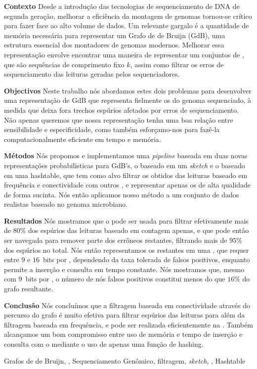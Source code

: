 \resumo

\textbf{Contexto} Desde a introdução das tecnologias de sequenciamento de DNA de segunda geração, melhorar a eficiência da montagem de genomas tornou-se crítico para fazer face ao alto volume de dados. Um relevante gargalo é a quantidade de memória necessária para representar um Grafo de de Bruijn (GdB), uma estrutura essencial dos montadores de genomas modernos. Melhorar essa representação envolve encontrar uma maneira de representar um conjuntos de \kmers, que são sequências de comprimento fixo $k$, assim como filtrar os erros de sequenciamento das leituras geradas pelos sequenciadores.

\noindent\textbf{Objectivos}  Neste trabalho nós abordamos estes dois problemas para desenvolver uma representação de GdB que representa fielmente os \kmers do genoma sequenciado, à medida que deixa fora trechos espúrios afetados por erros de sequenciamento. Não apenas queremos que nossa representação tenha uma boa relação entre sensibilidade e especificidade, como também esforçamo-nos para fazê-la computacionalmente eficiente em tempo e memória.

\noindent\textbf{Métodos} Nós propomos e implementamos uma \emph{pipeline} baseada em duas novas representações probabilisticas para GdB's, o \dBCM baseado em um \emph{sketch} \cm e o \dBHT baseado em uma hashtable, que tem como alvo filtrar os  obtidos das leituras baseado em frequência e conectividade com outros , e representar apenas os  de alta qualidade de forma sucinta. Nós então aplicamos nosso método a um conjunto de dados realistas baseado no genoma microbiano.

\noindent\textbf{Resultados} Nós mostramos que o \dBCM pode ser usada para filtrar efetivamente mais de $80\%$ dos  espúrios das leituras baseado em contagem apenas, e que pode então ser navegada para remover parte dos  errôneos restantes, filtrando mais de $95\%$ dos  espúrios no total. Nós então representamos os  restantes em uma \dBHT, que requer entre $9$ e $16$~bits por \kmer, dependendo da taxa tolerada de falsos positivos, enquanto permite a inserção e consulta em tempo constante. Nós mostramos que, mesmo com $9$~bits por \kmer, o número de nós falsos positivos constitui menos do que $16\%$ do grafo resultante.

\noindent\textbf{Conclusão} Nós concluímos que a filtragem baseada em conectividade através do percurso do grafo é muito efetiva para filtrar  espúrios das leituras para além da filtragem baseada em frequência, e pode ser realizada eficientemente na \dBCM. Também alcançamos um bom compromisso entre uso de memória e tempo de inserção e consulta com o \dBHT mediante o uso de apenas uma função de hashing.

\begin{keywords}
Grafos de de Bruijn, \kmer, Sequenciamento Genômico, filtragem, \emph{sketch}, \cm, Hashtable
\end{keywords}